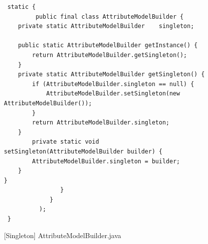 \begin{figure}[htb]
\centering
\lstset{language=Java, basicstyle=\scriptsize, stepnumber=1, showspaces=false, showstringspaces=false,breaklines=true}
\begin{lstlisting}
 static {
         public final class AttributeModelBuilder {
	private static AttributeModelBuilder	singleton;

	public static AttributeModelBuilder getInstance() {
		return AttributeModelBuilder.getSingleton();
	}
	private static AttributeModelBuilder getSingleton() {
		if (AttributeModelBuilder.singleton == null) {
			AttributeModelBuilder.setSingleton(new AttributeModelBuilder());
		}
		return AttributeModelBuilder.singleton;
	}
		private static void setSingleton(AttributeModelBuilder builder) {
		AttributeModelBuilder.singleton = builder;
	}
}
                }
             }
          );
 }
\end{lstlisting}
\caption{[Singleton] AttributeModelBuilder.java}
\label{fig:AttributeModelBuilder}
\end{figure}
\FloatBarrier
